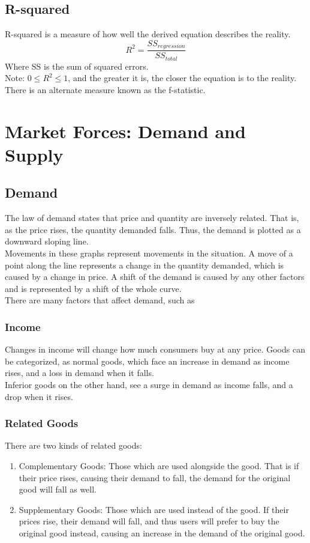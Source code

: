 \documentclass[nobib]{article}
\begin{document}
\subsection*{R-squared}
R-squared is a measure of how well the derived equation describes the
reality.\\
\begin{equation*}
    R^2 = \frac{SS_{regression}}{SS_{total}}
\end{equation*}
Where SS is the sum of squared errors.\\
Note: $0 \leq R^2 \leq 1$, and the greater it is, the closer the equation is to the reality.\\
There is an alternate measure known as the f-statistic.

\section{Market Forces: Demand and Supply}

\subsection{Demand}

The law of demand states that price and quantity are inversely related. That
is, as the price rises, the quantity demanded falls. Thus, the demand is
plotted as a downward sloping line.\\ Movements in these graphs represent
movements in the situation. A move of a point along the line represents a
change in the quantity demanded, which is caused by a change in price. A shift
of the demand is caused by any other factors and is represented by a shift of
the whole curve.\\ There are many factors that affect demand, such as
\subsubsection{Income}
Changes in income will change how much consumers buy at any price. Goods can be
categorized, as normal goods, which face an increase in demand as income rises,
and a loss in demand when it falls.\\ Inferior goods on the other hand, see a
surge in demand as income falls, and a drop when it rises.\\
\subsubsection{Related Goods}
There are two kinds of related goods:
\begin{enumerate}
    \item Complementary Goods: Those which are used alongside the good. That is if their
          price rises, causing their demand to fall, the demand for the original good
          will fall as well.
    \item Supplementary Goods: Those which are used instead of the good. If their prices
          rise, their demand will fall, and thus users will prefer to buy the original
          good instead, causing an increase in the demand of the original good.
\end{enumerate}
\end{document}

